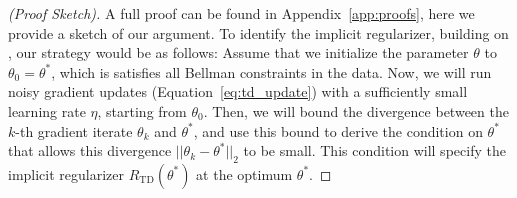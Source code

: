 \begin{proof}[(Proof Sketch)]
A full proof can be found in Appendix~\ref{app:proofs}, here we provide a sketch of our argument. To identify the implicit regularizer, building on \citep{blanc2020implicit}, our strategy would be as follows: Assume that we initialize the parameter $\theta$ to $\theta_0 = \theta^*$, which is satisfies all Bellman constraints in the data. Now, we will run noisy gradient updates (Equation~\ref{eq:td_update}) with a sufficiently small learning rate $\eta$, starting from $\theta_0$.  Then, we will bound the divergence between the $k$-th gradient iterate $\theta_k$ and $\theta^*$, and use this bound to derive the condition on $\theta^*$ that allows this divergence $||\theta_k - \theta^*||_2$ to be small. This condition will specify the implicit regularizer $R_\mathrm{TD}(\theta^*)$ at the optimum $\theta^*$. 


\end{proof}
